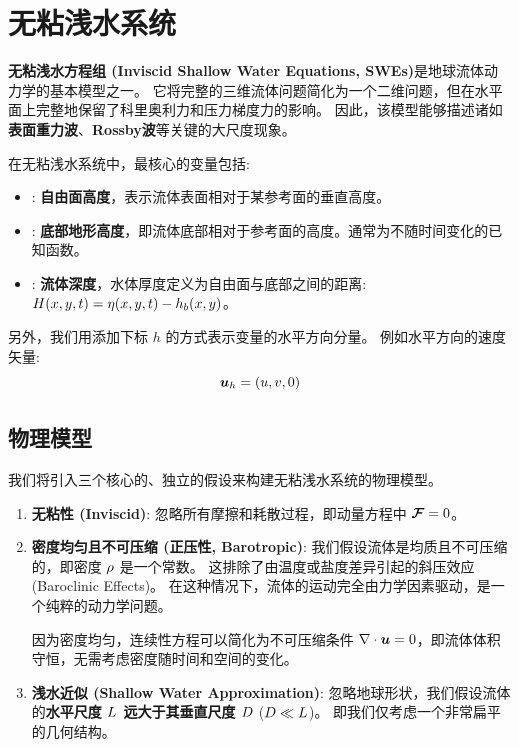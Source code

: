 \section{无粘浅水系统}

\textbf{无粘浅水方程组 (Inviscid Shallow Water Equations, SWEs)}是地球流体动力学的基本模型之一。
它将完整的三维流体问题简化为一个二维问题，但在水平面上完整地保留了科里奥利力和压力梯度力的影响。
因此，该模型能够描述诸如\textbf{表面重力波}、\textbf{Rossby波}等关键的大尺度现象。

在无粘浅水系统中，最核心的变量包括:

\begin{itemize}
    \item[$\freeheight(x, y, \timevar)$]: \textbf{自由面高度}，表示流体表面相对于某参考面的垂直高度。
    \item[$\bottomheight(x, y)$]: \textbf{底部地形高度}，即流体底部相对于参考面的高度。通常为不随时间变化的已知函数。
    \item[$\depth(x, y, \timevar)$]: \textbf{流体深度}，水体厚度定义为自由面与底部之间的距离: $H(x, y, t) = \eta(x, y, t) - h_b(x, y)$。
\end{itemize}

另外，我们用添加下标 $h$ 的方式表示变量的水平方向分量。
例如水平方向的速度矢量:
\begin{equation*}
    \bm{u}_h = (u, v, 0)
\end{equation*}

\subsection{物理模型}

我们将引入三个核心的、独立的假设来构建无粘浅水系统的物理模型。

\begin{enumerate}
    \item \textbf{无粘性 (Inviscid)}:
    忽略所有摩擦和耗散过程，即动量方程中 $\bm{\mathcal{F}} = 0$。

    \item \textbf{密度均匀且不可压缩 (正压性, Barotropic)}:
    我们假设流体是均质且不可压缩的，即密度 $\rho$ 是一个常数。
    这排除了由温度或盐度差异引起的斜压效应 (Baroclinic Effects)。
    在这种情况下，流体的运动完全由力学因素驱动，是一个纯粹的动力学问题。

    因为密度均匀，连续性方程可以简化为不可压缩条件 $\nabla \cdot \bm{u} = 0$，即流体体积守恒，无需考虑密度随时间和空间的变化。

    \item \textbf{浅水近似 (Shallow Water Approximation)}:
    忽略地球形状，我们假设流体的\textbf{水平尺度 $L$ 远大于其垂直尺度 $D$} ($D \ll L$)。
    即我们仅考虑一个非常扁平的几何结构。
\end{enumerate}

